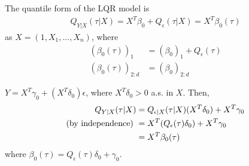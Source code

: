 \documentclass[11pt]{elegantbook}
\begin{document}
The quantile form of the LQR model is
\begin{equation}
    \begin{aligned}
        Q_{Y|X}(\tau|X)=X^T\beta_0+Q_{\epsilon}(\tau|X)=X^T\beta_0(\tau)
    \end{aligned}
    \label{linear_quantile}
\end{equation}
as $X=(1,X_1,...,X_n)$, where
\begin{equation}
    \begin{aligned}
        (\beta_0(\tau))_1&=(\beta_0)_1+Q_\epsilon(\tau)\\
        (\beta_0(\tau))_{2:d}&=(\beta_0)_{2:d}
    \end{aligned}
    \nonumber
\end{equation}

\begin{example}
    $Y=X^T\gamma_0+(X^T\delta_0)\epsilon$, where $X^T\delta_0>0$ a.s. in $X$. Then,
    \begin{equation}
        \begin{aligned}
            Q_{Y|X}(\tau|X)&=Q_{\epsilon|X}(\tau|X)(X^T\delta_0)+X^T\gamma_0\\
            \textnormal{(by independence) }&=X^T(Q_\epsilon(\tau)\delta_0)+X^T\gamma_0\\
            &=X^T\beta_0(\tau)
        \end{aligned}
        \nonumber
    \end{equation}
    where $\beta_0(\tau)=Q_\epsilon(\tau)\delta_0+\gamma_0$.
\end{example}
\end{document}

